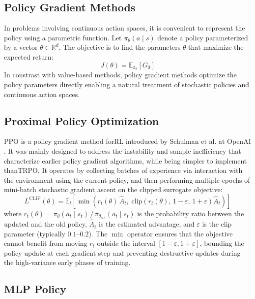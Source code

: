 \subsection{Policy Gradient Methods}
In problems involving continuous action spaces, it is convenient to represent the policy using a parametric function. Let $\pi_\theta(a \mid s)$ denote a policy parameterized by a vector $\theta \in \mathbb{R}^d$. The objective is to find the parameters $\theta$ that maximize the expected return:
\begin{equation}
    J(\theta) = \mathbb{E}_{\pi_\theta}[G_0]
\end{equation}
In constrast with value-based methods, policy gradient methods optimize the policy parameters directly enabling a natural treatment of stochastic policies and continuous action spaces.
\subsection{Proximal Policy Optimization}

\gls{PPO} is a policy gradient method for\gls{RL} introduced by Schulman et al. at OpenAI \cite{schulman2017ppo}. It was mainly designed to address the instability and sample inefficiency that characterize earlier policy gradient algorithms, while being simpler to implement than\gls{TRPO}. It operates by collecting batches of experience via interaction with the environment using the current policy, and then performing multiple epochs of mini-batch stochastic gradient ascent on the clipped surrogate objective:
\begin{equation}
    L^{\mathrm{CLIP}}(\theta) = \mathbb{E}_t\!\left[\min\!\left(r_t(\theta)\,\hat{A}_t,\;\mathrm{clip}\!\left(r_t(\theta),\,1-\varepsilon,\,1+\varepsilon\right)\hat{A}_t\right)\right]
\end{equation}
where $r_t(\theta) = \pi_\theta(a_t \mid s_t)\,/\,\pi_{\theta_{\mathrm{old}}}(a_t \mid s_t)$ is the probability ratio between the updated and the old policy, $\hat{A}_t$ is the estimated advantage, and $\varepsilon$ is the clip parameter (typically $0.1$--$0.2$). The $\min$ operator ensures that the objective cannot benefit from moving $r_t$ outside the interval $[1-\varepsilon, 1+\varepsilon]$, bounding the policy update at each gradient step and preventing destructive updates during the high-variance early phases of training.

\subsection{MLP Policy}


